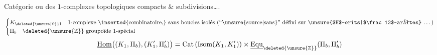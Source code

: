 Catégorie ou  des $1$-complexes topologiques compacts \& subdivisions\ldots.

\[
\left\{\begin{aligned}
&K_{\deleted{\unsure{0}}1}\quad\text{$1$-complexe \inserted{combinatoire,} sans boucles isolés (``\unsure{source|sans}'' défini sur \unsure{$H$-orits|$\frac12$-arêtes} \ldots)}\\
&\Pi_b\quad\deleted{\unsure{\mathbb Z}}\ \text{groupoïde $1$-spécial}
\end{aligned}\right.
\]
\[
\underline{\mathrm{Hom}}\big((K_1,\Pi_b),(K'_1,\Pi'_b)\big)
=\mathrm{Cat}\,(\mathrm{Isom}(K_1,K'_1))\times
\underline{\mathrm{Equ}}_{\deleted{\unsure{\mathbb Z}}}(\Pi_b,\Pi'_b)
\]
